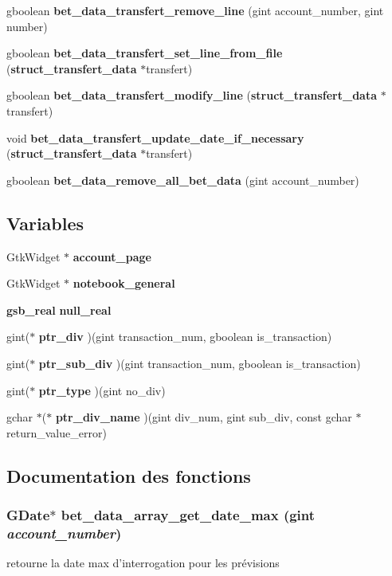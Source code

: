 \begin{DoxyCompactItemize}
\item 
gboolean {\bf bet\_\-data\_\-transfert\_\-remove\_\-line} (gint account\_\-number, gint number)
\item 
gboolean {\bf bet\_\-data\_\-transfert\_\-set\_\-line\_\-from\_\-file} ({\bf struct\_\-transfert\_\-data} $\ast$transfert)
\item 
gboolean {\bf bet\_\-data\_\-transfert\_\-modify\_\-line} ({\bf struct\_\-transfert\_\-data} $\ast$transfert)
\item 
void {\bf bet\_\-data\_\-transfert\_\-update\_\-date\_\-if\_\-necessary} ({\bf struct\_\-transfert\_\-data} $\ast$transfert)
\item 
gboolean {\bf bet\_\-data\_\-remove\_\-all\_\-bet\_\-data} (gint account\_\-number)
\end{DoxyCompactItemize}
\subsection*{Variables}
\begin{DoxyCompactItemize}
\item 
GtkWidget $\ast$ {\bf account\_\-page}
\item 
GtkWidget $\ast$ {\bf notebook\_\-general}
\item 
{\bf gsb\_\-real} {\bf null\_\-real}
\item 
gint($\ast$ {\bf ptr\_\-div} )(gint transaction\_\-num, gboolean is\_\-transaction)
\item 
gint($\ast$ {\bf ptr\_\-sub\_\-div} )(gint transaction\_\-num, gboolean is\_\-transaction)
\item 
gint($\ast$ {\bf ptr\_\-type} )(gint no\_\-div)
\item 
gchar $\ast$($\ast$ {\bf ptr\_\-div\_\-name} )(gint div\_\-num, gint sub\_\-div, const gchar $\ast$return\_\-value\_\-error)
\end{DoxyCompactItemize}


\subsection{Documentation des fonctions}
\subsubsection[{bet\_\-data\_\-array\_\-get\_\-date\_\-max}]{\setlength{\rightskip}{0pt plus 5cm}GDate$\ast$ bet\_\-data\_\-array\_\-get\_\-date\_\-max (gint {\em account\_\-number})}\label{bet__data_8c_a0ad9a8f139c9c1fe907454b3130192c3}
retourne la date max d'interrogation pour les prévisions 

